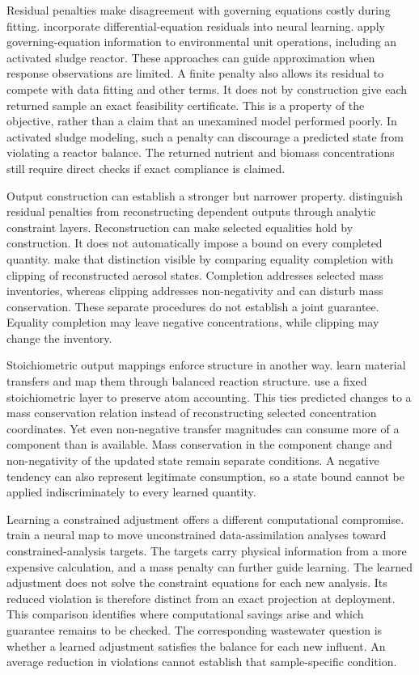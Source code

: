 Residual penalties make disagreement with governing equations costly during fitting. \citet{Raissi2019} incorporate differential-equation residuals into neural learning. \citet{Li2024} apply governing-equation information to environmental unit operations, including an activated sludge reactor. These approaches can guide approximation when response observations are limited. A finite penalty also allows its residual to compete with data fitting and other terms. It does not by construction give each returned sample an exact feasibility certificate. This is a property of the objective, rather than a claim that an unexamined model performed poorly. In activated sludge modeling, such a penalty can discourage a predicted state from violating a reactor balance. The returned nutrient and biomass concentrations still require direct checks if exact compliance is claimed.

Output construction can establish a stronger but narrower property. \citet{Beucler2021} distinguish residual penalties from reconstructing dependent outputs through analytic constraint layers. Reconstruction can make selected equalities hold by construction. It does not automatically impose a bound on every completed quantity. \citet{Harder2022} make that distinction visible by comparing equality completion with clipping of reconstructed aerosol states. Completion addresses selected mass inventories, whereas clipping addresses non-negativity and can disturb mass conservation. These separate procedures do not establish a joint guarantee. Equality completion may leave negative concentrations, while clipping may change the inventory.

Stoichiometric output mappings enforce structure in another way. \citet{SturmWexler2020} learn material transfers and map them through balanced reaction structure. \citet{SturmWexler2022} use a fixed stoichiometric layer to preserve atom accounting. This ties predicted changes to a mass conservation relation instead of reconstructing selected concentration coordinates. Yet even non-negative transfer magnitudes can consume more of a component than is available. Mass conservation in the component change and non-negativity of the updated state remain separate conditions. A negative tendency can also represent legitimate consumption, so a state bound cannot be applied indiscriminately to every learned quantity.

Learning a constrained adjustment offers a different computational compromise. \citet{Ruckstuhl2021} train a neural map to move unconstrained data-assimilation analyses toward constrained-analysis targets. The targets carry physical information from a more expensive calculation, and a mass penalty can further guide learning. The learned adjustment does not solve the constraint equations for each new analysis. Its reduced violation is therefore distinct from an exact projection at deployment. This comparison identifies where computational savings arise and which guarantee remains to be checked. The corresponding wastewater question is whether a learned adjustment satisfies the balance for each new influent. An average reduction in violations cannot establish that sample-specific condition.

